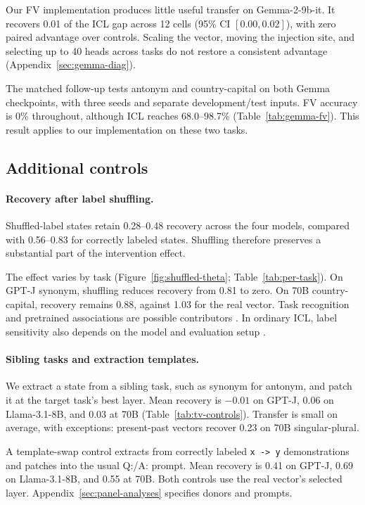 \documentclass[11pt]{article}
\begin{document}
Our FV implementation produces little useful transfer on Gemma-2-9b-it. It recovers 0.01 of the ICL gap across 12 cells (95\% CI $[0.00,0.02]$), with zero paired advantage over controls. Scaling the vector, moving the injection site, and selecting up to 40 heads across tasks do not restore a consistent advantage (Appendix~\ref{sec:gemma-diag}).

The matched follow-up tests antonym and country-capital on both Gemma checkpoints, with three seeds and separate development/test inputs. FV accuracy is 0\% throughout, although ICL reaches 68.0--98.7\% (Table~\ref{tab:gemma-fv}). This result applies to our implementation on these two tasks.

\subsection{Additional controls}
\label{sec:beyond}

\paragraph{Recovery after label shuffling.} Shuffled-label states retain 0.28--0.48 recovery across the four models, compared with 0.56--0.83 for correctly labeled states. Shuffling therefore preserves a substantial part of the intervention effect.

The effect varies by task (Figure~\ref{fig:shuffled-theta}; Table~\ref{tab:per-task}). On GPT-J synonym, shuffling reduces recovery from 0.81 to zero. On 70B country-capital, recovery remains 0.88, against 1.03 for the real vector. Task recognition and pretrained associations are possible contributors \citep{pan2023what,min2022rethinking}. In ordinary ICL, label sensitivity also depends on the model and evaluation setup \citep{yoo2022groundtruth,wei2023larger,kossen2024incontext}.

\paragraph{Sibling tasks and extraction templates.} We extract a state from a sibling task, such as synonym for antonym, and patch it at the target task's best layer. Mean recovery is $-0.01$ on GPT-J, 0.06 on Llama-3.1-8B, and 0.03 at 70B (Table~\ref{tab:tv-controls}). Transfer is small on average, with exceptions: present-past vectors recover 0.23 on 70B singular-plural.

A template-swap control extracts from correctly labeled \texttt{x -> y} demonstrations and patches into the usual Q:/A: prompt. Mean recovery is 0.41 on GPT-J, 0.69 on Llama-3.1-8B, and 0.55 at 70B. Both controls use the real vector's selected layer. Appendix~\ref{sec:panel-analyses} specifies donors and prompts.
\end{document}
